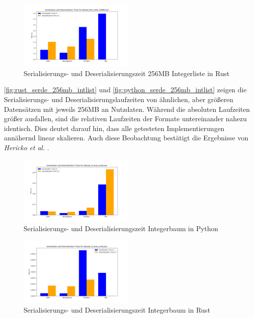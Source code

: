 \documentclass[ngerman]{seminarvorlage}
\begin{document}
\begin{figure}[h]
  \centering
  \includegraphics[width=0.5\textwidth]{images/graphs/rust_dataset_flat_intlist_256MB_json_combined_times.png}
  \caption{Serialisierungs- und Deserialisierungszeit 256MB Integerliste in Rust}
  \label{fig:rust_serde_256mb_intlist}
\end{figure}

\autoref{fig:rust_serde_256mb_intlist} und \autoref{fig:python_serde_256mb_intlist} zeigen die Serialisierungs- und Deserialisierungslaufzeiten von ähnlichen, aber größeren Datensätzen mit jeweils 256MB an Nutzdaten. Während die absoluten Laufzeiten größer ausfallen, sind die relativen Laufzeiten der Formate untereinander nahezu identisch. Dies deutet darauf hin, dass alle getesteten Implementierungen annähernd linear skalieren. Auch diese Beobachtung bestätigt die Ergebnisse von \textit{Hericko et al.} \cite[Figure 9]{10.1145/944579.944589}.

\begin{figure}[h]
  \centering
  \includegraphics[width=0.5\textwidth]{images/graphs/python_dataset_int_tree_small_json_combined_times.png}
  \caption{Serialisierungs- und Deserialisierungszeit Integerbaum in Python}
  \label{fig:python_serde_8mb_inttree}
\end{figure}

\begin{figure}[h]
  \centering
  \includegraphics[width=0.5\textwidth]{images/graphs/rust_dataset_int_tree_small_json_combined_times.png}
  \caption{Serialisierungs- und Deserialisierungszeit Integerbaum in Rust}
  \label{fig:rust_serde_8mb_inttree}
\end{figure}
\end{document}
